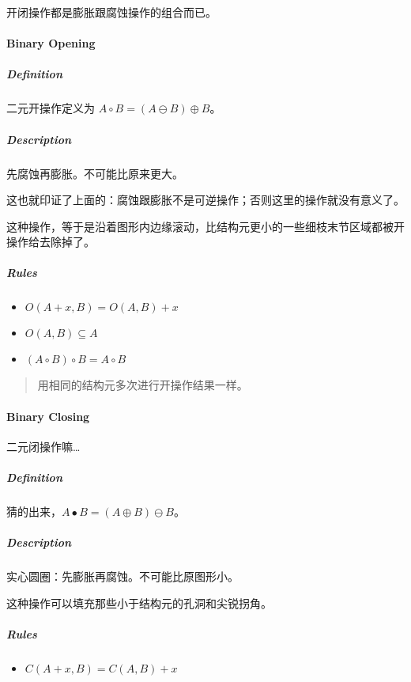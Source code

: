 \documentclass[
]{article}
\begin{document}
开闭操作都是膨胀跟腐蚀操作的组合而已。

\hypertarget{header-n68}{%
\paragraph{Binary Opening}\label{header-n68}}

\hypertarget{header-n69}{%
\subparagraph{Definition}\label{header-n69}}

二元开操作定义为 \(A ∘ B = (A ⊖ B) ⊕ B\)。

\hypertarget{header-n71}{%
\subparagraph{Description}\label{header-n71}}

先腐蚀再膨胀。不可能比原来更大。

这也就印证了上面的：腐蚀跟膨胀不是可逆操作；否则这里的操作就没有意义了。

这种操作，等于是沿着图形内边缘滚动，比结构元更小的一些细枝末节区域都被开操作给去除掉了。

\hypertarget{header-n75}{%
\subparagraph{Rules}\label{header-n75}}

\begin{itemize}
\item
  \(O(A + x, B) = O(A, B) + x\)
\item
  \(O(A, B) ⊆ A\)
\item
  \((A ∘ B) ∘ B = A ∘ B\)
\end{itemize}

\begin{quote}
用相同的结构元多次进行开操作结果一样。
\end{quote}

\hypertarget{header-n85}{%
\paragraph{Binary Closing}\label{header-n85}}

二元闭操作嘛\ldots{}

\hypertarget{header-n87}{%
\subparagraph{Definition}\label{header-n87}}

猜的出来，\(A ∙ B = (A ⊕ B) ⊖ B\)。

\hypertarget{header-n89}{%
\subparagraph{Description}\label{header-n89}}

实心圆圈：先膨胀再腐蚀。不可能比原图形小。

这种操作可以填充那些小于结构元的孔洞和尖锐拐角。

\hypertarget{header-n92}{%
\subparagraph{Rules}\label{header-n92}}

\begin{itemize}
\item
  \(C(A + x, B) = C(A, B) + x\)
\end{itemize}
\end{document}
